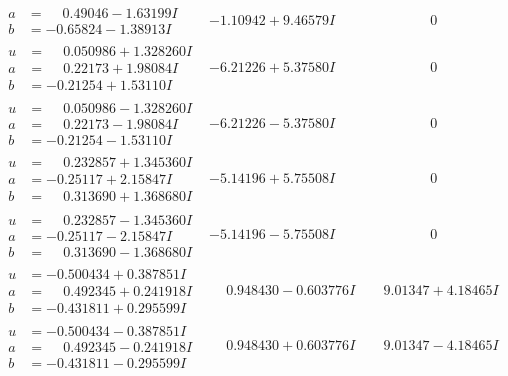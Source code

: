 \documentclass[1p]{elsarticle_modified}
\theoremstyle{definition}
\begin{document}
$$\begin{array}{c|c|c}
\begin{aligned}
a &= \phantom{-}0.49046 - 1.63199 I \\
b &= -0.65824 - 1.38913 I\end{aligned}
 & -1.10942 + 9.46579 I & \phantom{-0.000000 } 0 \\ \hline\begin{aligned}
u &= \phantom{-}0.050986 + 1.328260 I \\
a &= \phantom{-}0.22173 + 1.98084 I \\
b &= -0.21254 + 1.53110 I\end{aligned}
 & -6.21226 + 5.37580 I & \phantom{-0.000000 } 0 \\ \hline\begin{aligned}
u &= \phantom{-}0.050986 - 1.328260 I \\
a &= \phantom{-}0.22173 - 1.98084 I \\
b &= -0.21254 - 1.53110 I\end{aligned}
 & -6.21226 - 5.37580 I & \phantom{-0.000000 } 0 \\ \hline\begin{aligned}
u &= \phantom{-}0.232857 + 1.345360 I \\
a &= -0.25117 + 2.15847 I \\
b &= \phantom{-}0.313690 + 1.368680 I\end{aligned}
 & -5.14196 + 5.75508 I & \phantom{-0.000000 } 0 \\ \hline\begin{aligned}
u &= \phantom{-}0.232857 - 1.345360 I \\
a &= -0.25117 - 2.15847 I \\
b &= \phantom{-}0.313690 - 1.368680 I\end{aligned}
 & -5.14196 - 5.75508 I & \phantom{-0.000000 } 0 \\ \hline\begin{aligned}
u &= -0.500434 + 0.387851 I \\
a &= \phantom{-}0.492345 + 0.241918 I \\
b &= -0.431811 + 0.295599 I\end{aligned}
 & \phantom{-}0.948430 - 0.603776 I & \phantom{-}9.01347 + 4.18465 I \\ \hline\begin{aligned}
u &= -0.500434 - 0.387851 I \\
a &= \phantom{-}0.492345 - 0.241918 I \\
b &= -0.431811 - 0.295599 I\end{aligned}
 & \phantom{-}0.948430 + 0.603776 I & \phantom{-}9.01347 - 4.18465 I\\

\end{array}$$
\end{document}
